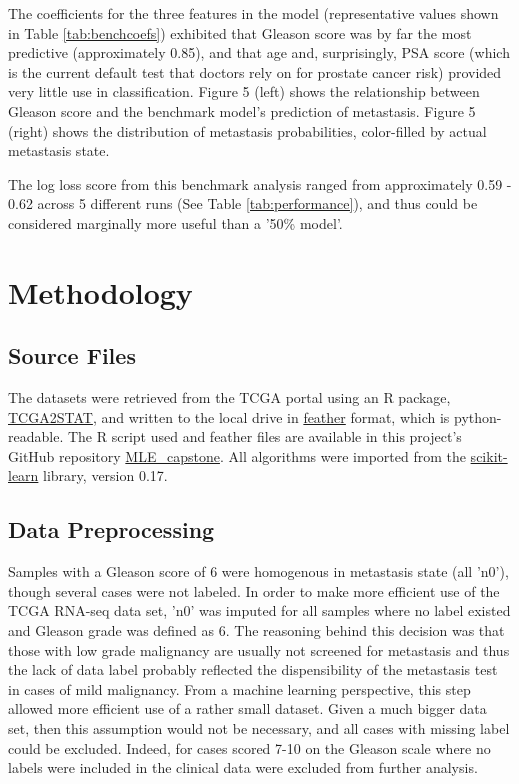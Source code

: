 \documentclass[final]{article}
\begin{document}
The coefficients for the three features in the model (representative values shown in Table \ref{tab:benchcoefs}) exhibited that
Gleason score was by far the most predictive (approximately 0.85), and that age and, surprisingly,
PSA score (which is the current default test that doctors rely on
for prostate cancer risk)  provided very little use in classification.  Figure 5
(left) shows the relationship between Gleason score and the benchmark model's
prediction of metastasis.  Figure 5 (right) shows the distribution of metastasis
probabilities, color-filled by actual metastasis state.

The log loss score from this benchmark analysis ranged from approximately 0.59 - 0.62 across 5 different runs (See Table \ref{tab:performance}), and
thus could be considered marginally more useful than a '50\% model'.


\section{Methodology}

\subsection{Source Files}

The datasets were retrieved from the TCGA portal using an R package,
\href{https://cran.r-project.org/web/packages/TCGA2STAT/index.html}{TCGA2STAT},
and written to the local drive in \href{https://github.com/wesm/feather}{feather} format,
which is python-readable.  The R script used and feather files are
available in this project's GitHub repository
\href{https://github.com/CCThompson82/MLE\_capstone}{MLE\_capstone}.  All
algorithms were imported from the
\href{http://scikit-learn.org/stable/}{scikit-learn} library, version 0.17.

\subsection{Data Preprocessing}

Samples with a Gleason score of 6 were homogenous in metastasis state (all
'n0'), though several cases were not labeled.  In order to make more efficient use
of the  TCGA RNA-seq data set, 'n0' was imputed for all samples where no label
existed and  Gleason grade was defined as 6.  The reasoning behind this decision
was that those with low grade malignancy are usually not screened for
metastasis and thus the lack of data label probably reflected the
dispensibility of the metastasis test in cases of mild malignancy. From a
machine learning perspective, this step allowed more efficient use of a rather
small dataset.  Given a much bigger data set, then this assumption would not be
necessary, and  all cases with missing label could be excluded.  Indeed, for
cases scored 7-10 on the Gleason scale where no labels were included in the
clinical data were excluded from further analysis.
\end{document}
